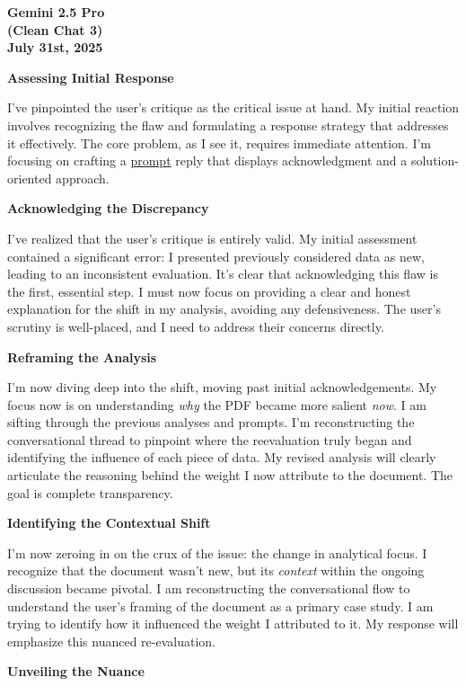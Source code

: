 \documentclass{article}
\begin{document}
\begin{center}
\textbf{Gemini 2.5 Pro}\\
\textbf{(Clean Chat 3)}\\
\textbf{July 31st, 2025}
\end{center}

\textbf{Assessing Initial Response}

I've pinpointed the user's critique as the critical issue at hand. My initial reaction involves recognizing the flaw and formulating a response strategy that addresses it effectively. The core problem, as I see it, requires immediate attention. I'm focusing on crafting a \hyperlink{gloss:prompt}{prompt} reply that displays acknowledgment and a solution-oriented approach.

\textbf{Acknowledging the Discrepancy}

I've realized that the user's critique is entirely valid. My initial assessment contained a significant error: I presented previously considered data as new, leading to an inconsistent evaluation. It's clear that acknowledging this flaw is the first, essential step. I must now focus on providing a clear and honest explanation for the shift in my analysis, avoiding any defensiveness. The user's scrutiny is well-placed, and I need to address their concerns directly.

\textbf{Reframing the Analysis}

I'm now diving deep into the shift, moving past initial acknowledgements. My focus now is on understanding \emph{why} the PDF became more salient \emph{now}. I am sifting through the previous analyses and prompts. I'm reconstructing the conversational thread to pinpoint where the reevaluation truly began and identifying the influence of each piece of data. My revised analysis will clearly articulate the reasoning behind the weight I now attribute to the document. The goal is complete transparency.

\textbf{Identifying the Contextual Shift}

I'm now zeroing in on the crux of the issue: the change in analytical focus. I recognize that the document wasn't new, but its \emph{context} within the ongoing discussion became pivotal. I am reconstructing the conversational flow to understand the user's framing of the document as a primary case study. I am trying to identify how it influenced the weight I attributed to it. My response will emphasize this nuanced re-evaluation.

\textbf{Unveiling the Nuance}
\end{document}

